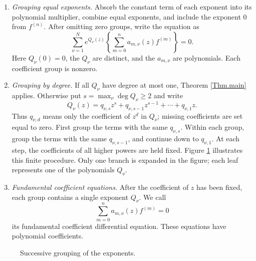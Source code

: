 \documentclass[a4paper,12pt]{article}
\numberwithin{equation}{section}
\begin{document}
\begin{enumerate}
\item \textit{Grouping equal exponents.}
Absorb the constant term of each exponent into its polynomial multiplier,
combine equal exponents, and include the exponent $0$ from $f^{(n)}$.
After omitting zero groups, write the equation as
\begin{equation}\label{eq.full.exponents}
 \sum_{\nu=1}^{N}e^{Q_\nu(z)}
       \left\{\sum_{m=0}^{n}a_{m,\nu}(z)f^{(m)}\right\}=0.
\end{equation}
Here $Q_\nu(0)=0$, the $Q_\nu$ are distinct, and the $a_{m,\nu}$ are
polynomials. Each coefficient group is nonzero.

\item \textit{Grouping by degree.}
If all $Q_\nu$ have degree at most one, Theorem \ref{Thm.main} applies.
Otherwise put $s=\max_\nu\deg Q_\nu\ge2$ and write
\[
 Q_\nu(z)=q_{\nu,s}z^s+q_{\nu,s-1}z^{s-1}+\cdots+q_{\nu,1}z.
\]
Thus $q_{\nu,d}$ means only the coefficient of $z^d$ in $Q_\nu$;
missing coefficients are set equal to zero.
First group the terms with the same $q_{\nu,s}$.
Within each group, group the terms with the same $q_{\nu,s-1}$,
and continue down to $q_{\nu,1}$.
At each step, the coefficients of all higher powers are held fixed.
Figure \ref{fig.leading.coeff.} illustrates this finite procedure.
Only one branch is expanded in the figure; each leaf represents
one of the polynomials $Q_\nu$.

\item \textit{Fundamental coefficient equations.}
After the coefficient of $z$ has been fixed, each group contains a single
exponent $Q_\nu$. We call
\begin{equation}\label{coeff.eq}
 \sum_{m=0}^{n}a_{m,\nu}(z)f^{(m)}=0
\end{equation}
its fundamental coefficient differential equation.
These equations have polynomial coefficients.
\end{enumerate}

\begin{figure}[ht]
\centering
{}
\caption{Successive grouping of the exponents.}
\label{fig.leading.coeff.}
\end{figure}
\end{document}
